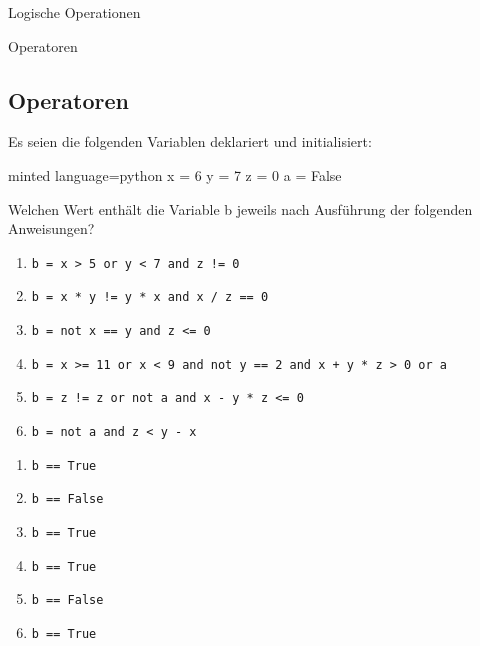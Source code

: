 \begin{task}[points=auto]{Logische Operationen }
    \begin{subtask*}[points=0]{Operatoren}
        \subsection{Operatoren}
        Es seien die folgenden Variablen deklariert und initialisiert:
        \begin{codeBlock}[]{minted language=python}
            x = 6
            y = 7
            z = 0
            a = False
        \end{codeBlock}
        Welchen Wert enthält die Variable b jeweils nach Ausführung der folgenden Anweisungen?
        \begin{enumerate}
            \item \lstinline{b = x > 5 or y < 7 and z != 0}
            \item \lstinline{b = x * y != y * x and x / z == 0}
            \item \lstinline{b = not x == y and z <= 0}
            \item \lstinline{b = x >= 11 or x < 9 and not y == 2 and x + y * z > 0 or a}
            \item \lstinline{b = z != z or not a and x - y * z <= 0}
            \item \lstinline{b = not a and z < y - x}
        \end{enumerate}

        \begin{solution}
            \begin{multicols}{3}
                \begin{enumerate}
                    \item \lstinline{b == True}
                    \item \lstinline{b == False}
                    \item \lstinline{b == True}
                    \item \lstinline{b == True}
                    \item \lstinline{b == False}
                    \item \lstinline{b == True}
                \end{enumerate}
            \end{multicols}
        \end{solution}
    \end{subtask*}
\end{task}
